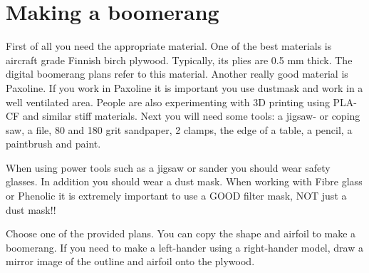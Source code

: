 \section{Making a boomerang} %
First of all you need the appropriate material. One of the best materials is aircraft grade Finnish birch plywood. Typically, its plies are 0.5 mm thick. The digital boomerang plans refer to this material. Another really good material is Paxoline. If you work in Paxoline it is important you use dustmask and work in a well ventilated area. People are also experimenting with 3D printing using PLA-CF and similar stiff materials.
Next you will need some tools: a jigsaw- or coping saw, a file, 80 and 180 grit sandpaper, 2 clamps, the edge of a table, a pencil, a paintbrush and paint. 

\begin{center}
\colorbox{BOrange!30}{\parbox{30em}{\centering
\colorbox{BOrange!30}{\parbox{28em}{
	\color{black}
\label{Sec:SafetyMaterials}
When using power tools such as a jigsaw or sander you should wear safety glasses. In addition you should wear a dust mask. When working with Fibre glass or Phenolic it is extremely important to use a GOOD filter mask, NOT just a dust mask!!
}}}}
\end{center}
Choose one of the provided plans. You can copy the shape and airfoil to make a boomerang. If you need to make a left-hander using a right-hander model, draw a mirror image of the outline and airfoil onto the plywood.

